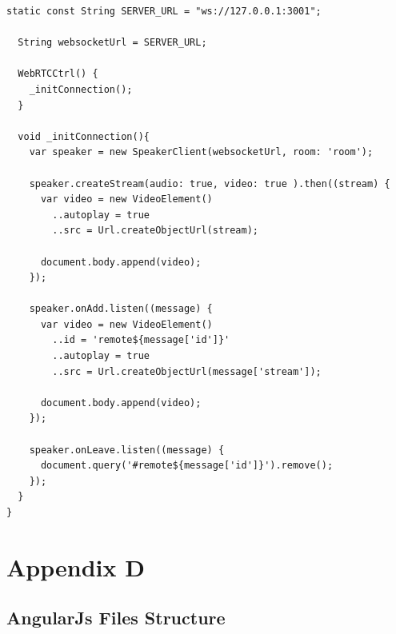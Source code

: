 \begin{appendices}
\begin{lstlisting}[caption={WebRTCCtrl in Dart application client},label={code:dart_webrtcctrl}]
  static const String SERVER_URL = "ws://127.0.0.1:3001";

  String websocketUrl = SERVER_URL;

  WebRTCCtrl() {
    _initConnection();
  }

  void _initConnection(){
    var speaker = new SpeakerClient(websocketUrl, room: 'room');

    speaker.createStream(audio: true, video: true ).then((stream) {
      var video = new VideoElement()
        ..autoplay = true
        ..src = Url.createObjectUrl(stream);

      document.body.append(video);
    });

    speaker.onAdd.listen((message) {
      var video = new VideoElement()
        ..id = 'remote${message['id']}'
        ..autoplay = true
        ..src = Url.createObjectUrl(message['stream']);

      document.body.append(video);
    });

    speaker.onLeave.listen((message) {
      document.query('#remote${message['id']}').remove();
    });
  }
}
\end{lstlisting}

\chapter{Appendix D}

\section{AngularJs Files Structure} 
\label{code:angularjs_structure}


\end{appendices}
